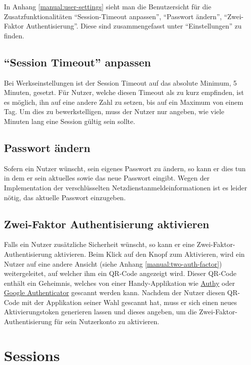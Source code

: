\documentclass[12pt,DIV14,BCOR10mm,a4paper,parskip=half-,headsepline,headinclude,english,ngerman,bibliography=totocnumbered]{scrreprt}
\begin{document}
In Anhang \autoref{manual:user-settings} sieht man die Benutzersicht für die Zusatzfunktionalitäten \enquote{Session-Timeout anpassen}, \enquote{Passwort ändern}, \enquote{Zwei-Faktor Authentisierung}.
Diese sind zusammengefasst unter \enquote{Einstellungen} zu finden.

\subsection{\enquote{Session Timeout} anpassen}

Bei Werkseinstellungen ist der Session Timeout auf das absolute Minimum, 5 Minuten, gesetzt.
Für Nutzer, welche diesen Timeout als zu kurz empfinden, ist es möglich, ihn auf eine andere Zahl zu setzen, bis auf ein Maximum von einem Tag.
Um dies zu bewerkstelligen, muss der Nutzer nur angeben, wie viele Minuten lang eine Session gültig sein sollte.

\subsection{Passwort ändern}

Sofern ein Nutzer wünscht, sein eigenes Passwort zu ändern, so kann er dies tun in dem er sein aktuelles sowie das neue Passwort eingibt.
Wegen der Implementation der verschlüsselten Netzdienstanmeldeinformationen ist es leider nötig, das aktuelle Passwort einzugeben.

\subsection{Zwei-Faktor Authentisierung aktivieren}

Falls ein Nutzer zusätzliche Sicherheit wünscht, so kann er eine Zwei-Faktor-Authentisierung aktivieren.
Beim Klick auf den Knopf zum Aktivieren, wird ein Nutzer auf eine andere Ansicht (siehe Anhang \ref{manual:two-auth-factor}) weitergeleitet, auf welcher ihm ein QR-Code angezeigt wird.
Dieser QR-Code enthält ein Geheimnis, welches von einer Handy-Applikation wie \href{https://authy.com/}{Authy}
 oder \href{https://play.google.com/store/apps/details?id=com.google.android.apps.authenticator2&hl=en}{Google Authenticator} gescannt werden kann.
Nachdem der Nutzer diesen QR-Code mit der Applikation seiner Wahl gescannt hat, muss er sich einen neues Aktivierungstoken generieren lassen und dieses angeben, um die Zwei-Faktor-Authentisierung für sein Nutzerkonto zu aktivieren.

\section{Sessions}
\end{document}
